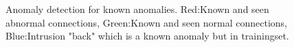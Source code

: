 \begin{figure}[htb2]
\begin{center}
\end{center}
\caption{Anomaly detection for known anomalies. Red:Known and seen abnormal connections, Green:Known and seen normal connections, Blue:Intrusion "back" which is a known anomaly but in trainingset.} %
\label{fig:refSingleRobot1}

\end{figure}
